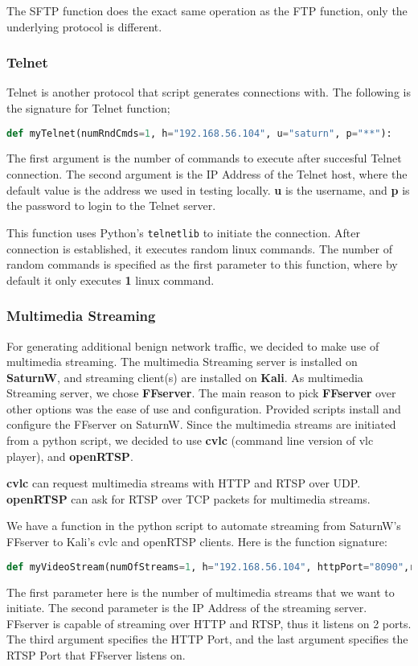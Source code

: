 \documentclass[a4paper]{article}
\begin{document}
The SFTP function does the exact same operation as the FTP function, only the underlying protocol is different.

\subsubsection{Telnet}
Telnet is another protocol that script generates connections with. 
The following is the signature for Telnet function;
\begin{lstlisting}[language=Python, numbers=none]
def myTelnet(numRndCmds=1, h="192.168.56.104", u="saturn", p="**"):
\end{lstlisting}

The first argument is the number of commands to execute after succesful Telnet connection.
The second argument is the IP Address of the Telnet host, where the default value is the address we used in testing locally. 
\textbf{u} is the username, and \textbf{p} is the password to login to the Telnet server.

This function uses Python's \texttt{telnetlib} to initiate the connection.
After connection is established, it executes random linux commands.
The number of random commands is specified as the first parameter to this function, where by default it only executes \textbf{1} linux command.

\subsubsection{Multimedia Streaming}
For generating additional benign network traffic, we decided to make use of multimedia streaming.
The multimedia Streaming server is installed on \textbf{SaturnW}, and streaming client(s) are installed on \textbf{Kali}.
As multimedia Streaming server, we chose \textbf{FFserver}. 
The main reason to pick \textbf{FFserver} over other options was the ease of use and configuration.
Provided scripts install and configure the FFserver on SaturnW. 
Since the multimedia streams are initiated from a python script, we decided to use \textbf{cvlc} (command line version of vlc player), and \textbf{openRTSP}. 

\textbf{cvlc} can request multimedia streams with HTTP and RTSP over UDP.
\textbf{openRTSP} can ask for RTSP over TCP packets for multimedia streams.

We have a function in the python script to automate streaming from SaturnW's FFserver to Kali's cvlc and openRTSP clients.
Here is the function signature:
\begin{lstlisting}[language=Python, numbers=none]
def myVideoStream(numOfStreams=1, h="192.168.56.104", httpPort="8090",rtspPort="5454"):
\end{lstlisting}
The first parameter here is the number of multimedia streams that we want to initiate. 
The second parameter is the IP Address of the streaming server.
FFserver is capable of streaming over HTTP and RTSP, thus it listens on 2 ports.
The third argument specifies the HTTP Port, and the last argument specifies the RTSP Port that FFserver listens on.
\end{document}
